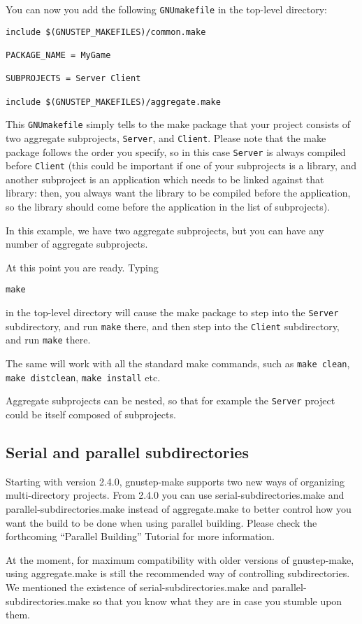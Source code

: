 \documentclass[a4paper]{article}
\begin{document}
You can now you add the following \texttt{GNUmakefile} in the
top-level directory:
\begin{verbatim}
include $(GNUSTEP_MAKEFILES)/common.make

PACKAGE_NAME = MyGame

SUBPROJECTS = Server Client

include $(GNUSTEP_MAKEFILES)/aggregate.make
\end{verbatim}
This \texttt{GNUmakefile} simply tells to the make package that your
project consists of two aggregate subprojects, \texttt{Server}, and
\texttt{Client}.  Please note that the make package follows the order
you specify, so in this case \texttt{Server} is always compiled before
\texttt{Client} (this could be important if one of your subprojects is
a library, and another subproject is an application which needs to be
linked against that library: then, you always want the library to be
compiled before the application, so the library should come before the
application in the list of subprojects).

In this example, we have two aggregate subprojects, but you can have
any number of aggregate subprojects.

At this point you are ready.  Typing
\begin{verbatim}
make
\end{verbatim}
in the top-level directory will cause the make package to step into
the \texttt{Server} subdirectory, and run \texttt{make} there, and
then step into the \texttt{Client} subdirectory, and run \texttt{make}
there.

The same will work with all the standard make commands, such as
\texttt{make clean}, \texttt{make distclean}, \texttt{make install}
etc.

Aggregate subprojects can be nested, so that for example the
\texttt{Server} project could be itself composed of subprojects.

\subsection{Serial and parallel subdirectories}
Starting with version 2.4.0, gnustep-make supports two new ways of
organizing multi-directory projects.  From 2.4.0 you can use
serial-subdirectories.make and parallel-subdirectories.make instead of
aggregate.make to better control how you want the build to be done
when using parallel building.  Please check the forthcoming ``Parallel
Building'' Tutorial for more information.

At the moment, for maximum compatibility with older versions of
gnustep-make, using aggregate.make is still the recommended way of
controlling subdirectories.  We mentioned the existence of
serial-subdirectories.make and parallel-subdirectories.make so that
you know what they are in case you stumble upon them.
\end{document}
